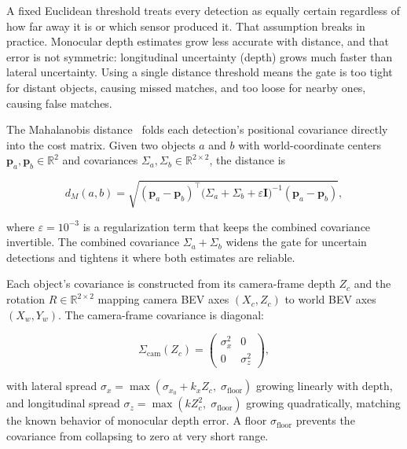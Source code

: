 \documentclass[12pt]{article}
\begin{document}
A fixed Euclidean threshold treats every detection as equally certain regardless of how far away it is or which sensor produced it. That assumption breaks in practice. Monocular depth estimates grow less accurate with distance, and that error is not symmetric: longitudinal uncertainty (depth) grows much faster than lateral uncertainty. Using a single distance threshold means the gate is too tight for distant objects, causing missed matches, and too loose for nearby ones, causing false matches.

\medskip
The Mahalanobis distance~\cite{mahalanobis1936} folds each detection's positional covariance directly into the cost matrix. Given two objects $a$ and $b$ with world-coordinate centers $\mathbf{p}_a, \mathbf{p}_b \in \mathbb{R}^2$ and covariances $\Sigma_a, \Sigma_b \in \mathbb{R}^{2\times 2}$, the distance is

\begin{equation}
    d_M(a,b) = \sqrt{(\mathbf{p}_a - \mathbf{p}_b)^\top
               \bigl(\Sigma_a + \Sigma_b + \varepsilon\mathbf{I}\bigr)^{-1}
               (\mathbf{p}_a - \mathbf{p}_b)},
    \label{eq:mahalanobis}
\end{equation}

\noindent where $\varepsilon = 10^{-3}$ is a regularization term that keeps the combined covariance invertible. The combined covariance $\Sigma_a + \Sigma_b$ widens the gate for uncertain detections and tightens it where both estimates are reliable.

\medskip
Each object's covariance is constructed from its camera-frame depth $Z_c$ and the rotation $R \in \mathbb{R}^{2\times 2}$ mapping camera BEV axes $(X_c, Z_c)$ to world BEV axes $(X_w, Y_w)$. The camera-frame covariance is diagonal:

\begin{equation}
    \Sigma_{\text{cam}}(Z_c) =
    \begin{pmatrix} \sigma_x^2 & 0 \\ 0 & \sigma_z^2 \end{pmatrix},
    \label{eq:cov_cam}
\end{equation}

\noindent with lateral spread $\sigma_x = \max(\sigma_{x_0} + k_x Z_c,\;\sigma_{\text{floor}})$ growing linearly with depth, and longitudinal spread $\sigma_z = \max(k Z_c^2,\;\sigma_{\text{floor}})$ growing quadratically, matching the known behavior of monocular depth error. A floor $\sigma_{\text{floor}}$ prevents the covariance from collapsing to zero at very short range.
\end{document}
